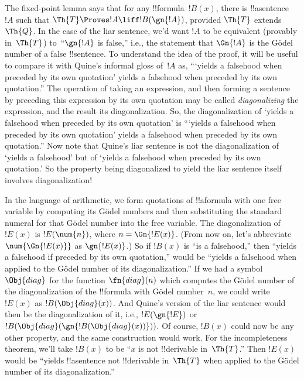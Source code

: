 \documentclass[../../../include/open-logic-section]{subfiles}
\begin{document}


\begin{explain}
The fixed-point lemma says that for any !!{formula}~$!B(x)$, there is
!!a{sentence}~$!A$ such that $\Th{T} \Proves !A \liff !B(\gn{!A})$,
provided $\Th{T}$ extends~$\Th{Q}$.  In the case of the liar sentence,
we'd want $!A$ to be equivalent (provably in~$\Th{T}$) to~``$\gn{!A}$
is false,'' i.e., the statement that $\Gn{!A}$ is the G\"odel number
of a false !!{sentence}. To understand the idea of the proof, it will
be useful to compare it with Quine's informal gloss of~$!A$ as,
``{}`yields a falsehood when preceded by its own quotation' yields a
falsehood when preceded by its own quotation.''  The operation of
taking an expression, and then forming a sentence by preceding this
expression by its own quotation may be called \emph{diagonalizing} the
expression, and the result its diagonalization. So, the
diagonalization of `yields a falsehood when preceded by its own
quotation' is ``{}`yields a falsehood when preceded by its own
quotation' yields a falsehood when preceded by its own quotation.''
Now note that Quine's liar sentence is not the diagonalization of
`yields a falsehood' but of `yields a falsehood when preceded by its
own quotation.' So the property being diagonalized to yield the liar
sentence itself involves diagonalization!{}

In the language of arithmetic, we form quotations of !!a{formula} with
one free variable by computing its G\"odel numbers and then
substituting the standard numeral for that G\"odel number into the
free variable. The diagonalization of~$!E(x)$ is $!E(\num{n})$, where
$n = \Gn{!E(x)}$. (From now on, let's abbreviate $\num{\Gn{!E(x)}}$ as
$\gn{!E(x)}$.)  So if $!B(x)$ is ``is a falsehood,'' then ``yields a
falsehood if preceded by its own quotation,'' would be ``yields a
falsehood when applied to the G\"odel number of its diagonalization.''
If we had a symbol~$\Obj{diag}$ for the function $\fn{diag}(n)$ which
computes the G\"odel number of the diagonalization of the !!{formula}
with G\"odel number~$n$, we could write $!E(x)$ as
$!B(\Obj{diag}(x))$. And Quine's version of the liar sentence would
then be the diagonalization of it, i.e., $!E(\gn{!E})$ or
$!B(\Obj{diag}(\gn{!B(\Obj{diag}(x))}))$.  Of course, $!B(x)$ could now
be any other property, and the same construction would work. For the
incompleteness theorem, we'll take $!B(x)$ to be ``$x$ is not !!{derivable}
in~$\Th{T}$.'' Then $!E(x)$ would be ``yields !!a{sentence} not !!{derivable}
in~$\Th{T}$ when applied to the G\"odel number of its
diagonalization.''


\end{explain}
\end{document}
